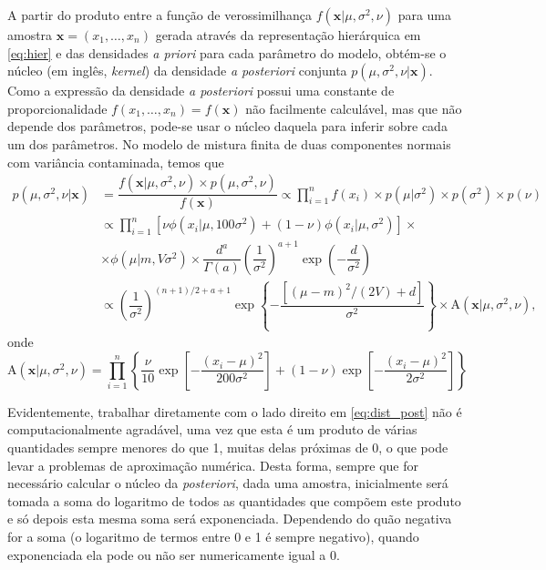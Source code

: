 \documentclass[12pt,reqno,a4paper,oneside]{article}
\begin{document}
A partir do produto entre a função de verossimilhança $f(\bm{x} | \mu, \sigma^2, \nu)$ para uma amostra $\bm{x} = (x_1, \ldots, x_n)$ gerada através da representação hierárquica em \eqref{eq:hier} e das densidades \textit{a priori} para cada parâmetro do modelo, obtém-se o núcleo (em inglês, \textit{kernel}) da densidade \textit{a posteriori} conjunta $p(\mu, \sigma^2, \nu | \bm{x})$. Como a expressão da densidade \textit{a posteriori} possui uma constante de proporcionalidade $f(x_1, \ldots, x_n) = f(\bm{x})$ não facilmente calculável, mas que não depende dos parâmetros, pode-se usar o núcleo daquela para inferir sobre cada um dos parâmetros. No modelo de mistura finita de duas componentes normais com variância contaminada, temos que
\begin{align}
p(\mu, \sigma^2, \nu | \bm{x})
&= \dfrac{f(\bm{x} | \mu, \sigma^2, \nu) \times p(\mu, \sigma^2, \nu)}{f(\bm{x})} \propto \prod_{i=1}^{n} f(x_i) \times p(\mu | \sigma^2) \times p(\sigma^2) \times p(\nu) \nonumber\\
&\propto \prod_{i=1}^{n} \left[ \nu \phi(x_i | \mu, 100 \sigma^2) + (1 - \nu) \phi(x_i | \mu, \sigma^2) \right] \times \nonumber \\
&\times \phi(\mu | m, V \sigma^2) \times \dfrac{d^a}{\Gamma(a)} \left(\dfrac{1}{\sigma^2}\right)^{a + 1} \exp\left(-\dfrac{d}{\sigma^2}\right) \nonumber \\
&\propto \left(\dfrac{1}{\sigma^2}\right)^{(n + 1)/2 + a + 1} \exp\left\{-\dfrac{\left[(\mu - m)^2 / (2V) + d\right]}{\sigma^2}\right\} \times \textrm{A}(\bm{x} | \mu, \sigma^2, \nu), \label{eq:dist_post}
\end{align}
onde
\begin{equation*}
\textrm{A}(\bm{x} | \mu, \sigma^2, \nu) = \prod_{i=1}^{n} \left\{  \dfrac{\nu}{10} \exp\left[-\dfrac{(x_i - \mu)^2}{200\sigma^2}\right] + (1 - \nu) \exp\left[-\dfrac{(x_i - \mu)^2}{2\sigma^2}\right] \right\}
\end{equation*}

Evidentemente, trabalhar diretamente com o lado direito em \eqref{eq:dist_post} não é computacionalmente agradável, uma vez que esta é um produto de várias quantidades sempre menores do que 1, muitas delas próximas de 0, o que pode levar a problemas de aproximação numérica. Desta forma, sempre que for necessário calcular o núcleo da \textit{posteriori}, dada uma amostra, inicialmente será tomada a soma do logaritmo de todos as quantidades que compõem este produto e só depois esta mesma soma será exponenciada. Dependendo do quão negativa for a soma (o logaritmo de termos entre 0 e 1 é sempre negativo), quando exponenciada ela pode ou não ser numericamente igual a 0.
\end{document}
